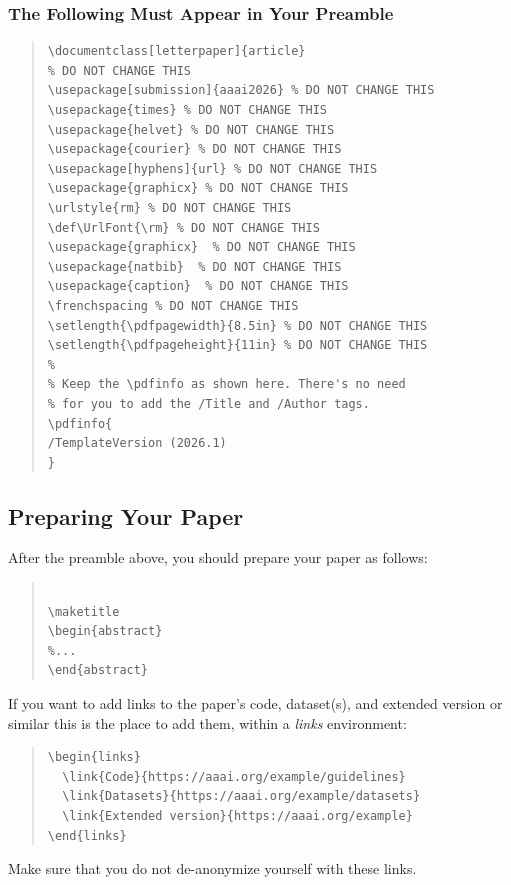 \subsubsection{The Following Must Appear in Your Preamble}
\begin{quote}
\begin{scriptsize}\begin{verbatim}
\documentclass[letterpaper]{article}
% DO NOT CHANGE THIS
\usepackage[submission]{aaai2026} % DO NOT CHANGE THIS
\usepackage{times} % DO NOT CHANGE THIS
\usepackage{helvet} % DO NOT CHANGE THIS
\usepackage{courier} % DO NOT CHANGE THIS
\usepackage[hyphens]{url} % DO NOT CHANGE THIS
\usepackage{graphicx} % DO NOT CHANGE THIS
\urlstyle{rm} % DO NOT CHANGE THIS
\def\UrlFont{\rm} % DO NOT CHANGE THIS
\usepackage{graphicx}  % DO NOT CHANGE THIS
\usepackage{natbib}  % DO NOT CHANGE THIS
\usepackage{caption}  % DO NOT CHANGE THIS
\frenchspacing % DO NOT CHANGE THIS
\setlength{\pdfpagewidth}{8.5in} % DO NOT CHANGE THIS
\setlength{\pdfpageheight}{11in} % DO NOT CHANGE THIS
%
% Keep the \pdfinfo as shown here. There's no need
% for you to add the /Title and /Author tags.
\pdfinfo{
/TemplateVersion (2026.1)
}
\end{verbatim}\end{scriptsize}
\end{quote}

\subsection{Preparing Your Paper}

After the preamble above, you should prepare your paper as follows:
\begin{quote}
\begin{scriptsize}\begin{verbatim}

\maketitle
\begin{abstract}
%...
\end{abstract}\end{verbatim}\end{scriptsize}
\end{quote}

\noindent If you want to add links to the paper's code, dataset(s), and extended version or similar this is the place to add them, within a \emph{links} environment:
\begin{quote}%
\begin{scriptsize}\begin{verbatim}
\begin{links}
  \link{Code}{https://aaai.org/example/guidelines}
  \link{Datasets}{https://aaai.org/example/datasets}
  \link{Extended version}{https://aaai.org/example}
\end{links}\end{verbatim}\end{scriptsize}
\end{quote}
\noindent Make sure that you do not de-anonymize yourself with these links.

